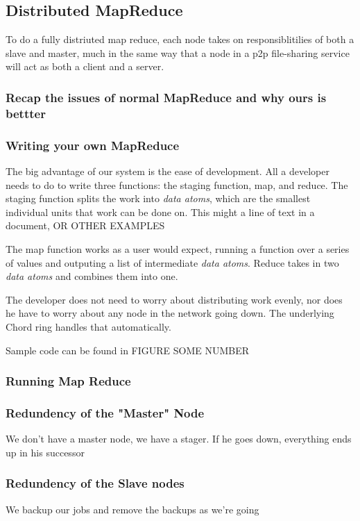 \documentclass[conference, compsocconf, letterpaper]{IEEEtran}
\begin{document}
\subsection{Distributed MapReduce}
To do a fully distriuted map reduce, each node takes on responsiblitilies of both a slave and master, much in the same way that a node in a p2p file-sharing service will act as both a client and a server.   
\subsubsection{Recap the issues  of normal MapReduce  and why ours is bettter} 


\subsubsection{Writing your own MapReduce}
The big advantage of our system is the ease of development.  All a developer needs to do to write three functions: the staging function, map, and reduce.  The staging function splits the work into \emph{data atoms}, which are the smallest individual units that work can be done on.  This might a line of text in a document, OR OTHER EXAMPLES

The map function works as a user would expect, running a function over a series of values and outputing a list of intermediate \emph{data atoms}.  Reduce takes in two \emph{data atoms} and combines them into one.

The developer does not need to worry about distributing work evenly, nor does he have to worry about any node in the network going down.  The underlying Chord ring handles that automatically.


Sample code can be found in FIGURE SOME NUMBER



\subsubsection{Running Map Reduce}
\subsubsection{Redundency of the "Master" Node}
We don't have a master node, we have a stager.  If he goes down, everything ends up in his successor



\subsubsection{Redundency of the Slave nodes}
We backup our jobs and remove the backups as we're going
\end{document}

